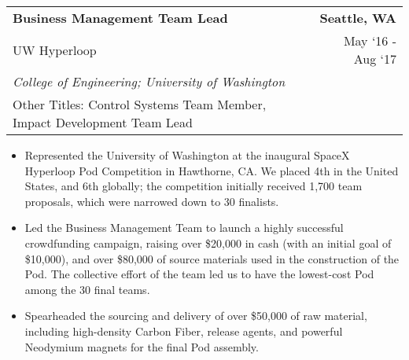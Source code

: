 \documentclass[10pt, letterpaper]{article}
\newcommand{\tabularxwidth}{\textwidth}
\begin{document}
    \begin{minipage}{\tabularxwidth}

        \begin{tabularx}{\tabularxwidth}{X r}
            \textbf{Business Management Team Lead} & \textbf{Seattle, 
        WA} \\
            UW Hyperloop & 
        
    May ‘16 - 
    Aug ‘17 \\
            
                
                    \textit{College of Engineering; University of Washington} & \\
                
            
            
                Other Titles: Control Systems Team Member, Impact Development Team Lead & \\
            
        \end{tabularx}

        \begin{itemize}[noitemsep, topsep=3pt, parsep=0pt, partopsep=0pt]
            
                \item 
    Represented the University of Washington at the inaugural SpaceX Hyperloop Pod Competition in Hawthorne, CA. We placed 4th in the United States, and 6th globally; the competition initially received 1,700 team proposals, which were narrowed down to 30 finalists.
            
                \item 
    Led the Business Management Team to launch a highly successful crowdfunding campaign, raising over \$20,000 in cash (with an initial goal of \$10,000), and over \$80,000 of source materials used in the construction of the Pod. The collective effort of the team led us to have the lowest-cost Pod among the 30 final teams.
            
                \item 
    Spearheaded the sourcing and delivery of over \$50,000 of raw material, including high-density Carbon Fiber, release agents, and powerful Neodymium magnets for the final Pod assembly.
            

\end{itemize}
\end{minipage}
\end{document}
